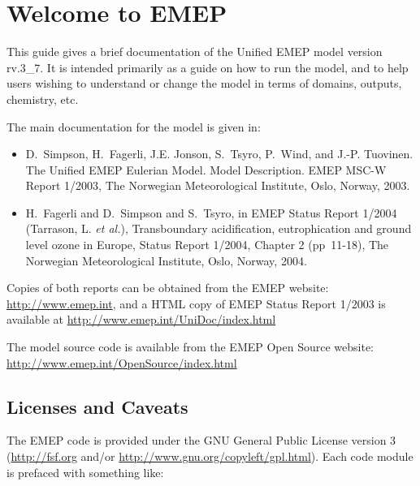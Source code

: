 \chapter{Welcome to EMEP }

This guide gives a brief documentation of the Unified EMEP model
version rv.3\_7.
It is intended primarily as a guide on how to run the model, and
to help users wishing to understand or change 
the model in terms of domains, outputs, chemistry, etc.

The main documentation for the model is given in:

\begin{itemize}
\item
D.~Simpson, H.~Fagerli, J.E. Jonson, S.~Tsyro, P.~Wind, and J.-P. Tuovinen.
{The Unified EMEP Eulerian Model. Model Description}.
EMEP MSC-W Report 1/2003, The Norwegian
Meteorological Institute, Oslo, Norway, 2003.
\item
H.~Fagerli and D.~Simpson and S.~Tsyro,
        in EMEP Status Report 1/2004 (Tarrason, L. {\sl et al.}), Transboundary acidification, eutrophication
        and ground level ozone in Europe, Status Report 1/2004, Chapter 2 (pp~11-18), The
        Norwegian Meteorological Institute, Oslo, Norway, 2004. 

\end{itemize}

 Copies of both reports can be obtained from the EMEP website: \\
\url{http://www.emep.int}, and a HTML copy of EMEP Status Report
1/2003 is
available at 
\url{http://www.emep.int/UniDoc/index.html}

The model source code is available from the  EMEP Open Source
  website: \url{http://www.emep.int/OpenSource/index.html}

\section{Licenses and Caveats}

The EMEP code is provided under the GNU General Public License version 3
(\url{http://fsf.org} and/or
\url{http://www.gnu.org/copyleft/gpl.html}).
\newpage 
Each code module is prefaced with something like:

